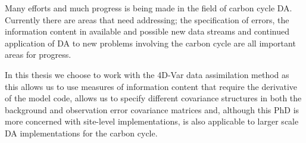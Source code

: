 Many efforts and much progress is being made in the field of carbon cycle DA. Currently there are areas that need addressing; the specification of errors, the information content in available and possible new data streams and continued application of DA to new problems involving the carbon cycle are all important areas for progress. 

In this thesis we choose to work with the 4D-Var data assimilation method as this allows us to use measures of information content that require the derivative of the model code, allows us to specify different covariance structures in both the background and observation error covariance matrices and, although this PhD is more concerned with site-level implementations, is also applicable to larger scale DA implementations for the carbon cycle. 






